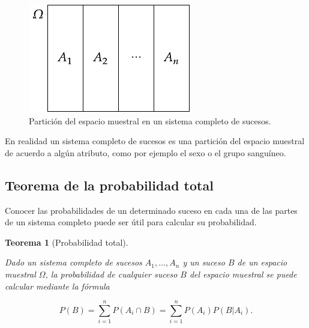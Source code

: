 \documentclass[
  a4paper,
]{scrreport}
\theoremstyle{plain}
\newtheorem{theorem}{Teorema}[chapter]
\theoremstyle{definition}
\theoremstyle{definition}
\theoremstyle{remark}
\begin{document}
\begin{figure}[H]

{\centering \includegraphics{img/probabilidad/particion_espacio_muestral.pdf}

}

\caption{Partición del espacio muestral en un sistema completo de
sucesos.}

\end{figure}%

En realidad un sistema completo de sucesos es una partición del espacio
muestral de acuerdo a algún atributo, como por ejemplo el sexo o el
grupo sanguíneo.

\subsection{Teorema de la probabilidad
total}\label{teorema-de-la-probabilidad-total-1}

Conocer las probabilidades de un determinado suceso en cada una de las
partes de un sistema completo puede ser útil para calcular su
probabilidad.

\begin{theorem}[Probabilidad
total]\protect\hypertarget{thm-probabilidad-total}{}\label{thm-probabilidad-total}

Dado un sistema completo de sucesos \(A_1,\ldots,A_n\) y un suceso \(B\)
de un espacio muestral \(\Omega\), la probabilidad de cualquier suceso
\(B\) del espacio muestral se puede calcular mediante la fórmula

\[P(B) = \sum_{i=1}^n P(A_i\cap B) = \sum_{i=1}^n P(A_i)P(B|A_i).\]

\end{theorem}
\end{document}
